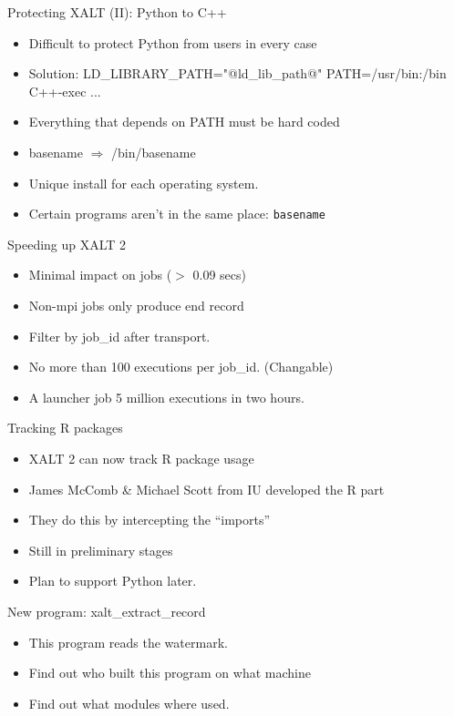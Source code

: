 \documentclass{beamer}
\begin{document}
\begin{frame}{Protecting XALT (II): Python to C++}
    \begin{itemize}
      \item Difficult to protect Python from users in every case
      \item Solution: LD\_LIBRARY\_PATH="@ld\_lib\_path@"
        PATH=/usr/bin:/bin C++-exec ...
      \item Everything that depends on PATH must be hard coded
      \item basename $\Rightarrow$ /bin/basename
      \item Unique install for each operating system.
      \item Certain programs aren't in the same place: \texttt{basename}
    \end{itemize}
\end{frame}

\begin{frame}{Speeding up XALT 2}
  \begin{itemize}
    \item Minimal impact on jobs ($>$ 0.09 secs)
    \item Non-mpi jobs only produce end record
    \item Filter by job\_id after transport.
    \item No more than 100 executions per job\_id.  (Changable)
    \item A launcher job 5 million executions in two hours.
  \end{itemize}
\end{frame}

\begin{frame}{Tracking R packages}
  \begin{itemize}
    \item XALT 2 can now track R package usage
    \item James McComb \& Michael Scott from IU developed the R part
    \item They do this by intercepting the ``imports''
    \item Still in preliminary stages
    \item Plan to support Python later.
  \end{itemize}
\end{frame}

\begin{frame}{New program: xalt\_extract\_record}
  \begin{itemize}
    \item This program reads the watermark.
    \item Find out who built this program on what machine
    \item Find out what modules where used.
  \end{itemize}
\end{frame}
\end{document}
